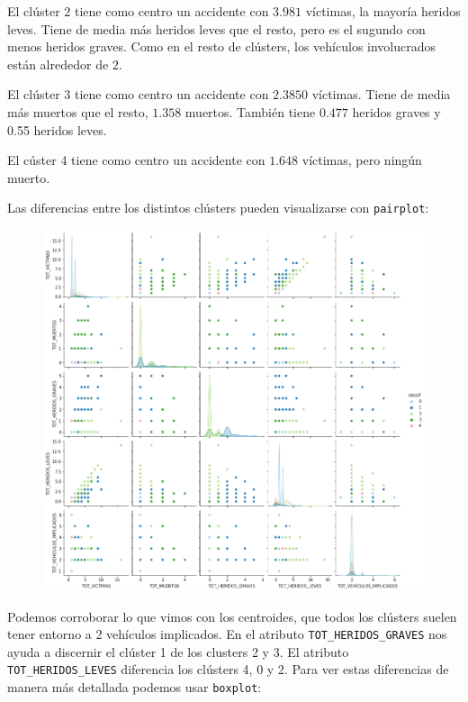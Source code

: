 \documentclass[a4]{article}
\begin{document}
El clúster $2$ tiene como centro un accidente con $3.981$ víctimas, la mayoría heridos leves. Tiene de media más heridos leves que el resto, pero es el sugundo con menos heridos graves. Como en el resto de clústers, los vehículos involucrados están alrededor de $2$.

El clúster $3$ tiene como centro un accidente con $2.3850$ víctimas. Tiene de media más muertos que el resto, $1.358$ muertos. También tiene $0.477$ heridos graves y 0.55 heridos leves.

El cúster 4 tiene como centro un accidente con $1.648$ víctimas, pero ningún muerto.

Las diferencias entre los distintos clústers pueden visualizarse con \texttt{pairplot}:

\begin{figure}[H]
  \centering
  \includegraphics[width=171mm]{imagenes/c1_kmeans_pairplot}
\end{figure}

Podemos corroborar lo que vimos con los centroides, que todos los clústers suelen tener entorno a 2 vehículos implicados. En el atributo \texttt{TOT\_HERIDOS\_GRAVES} nos ayuda a discernir el clúster 1 de los clusters 2 y 3. El atributo \texttt{TOT\_HERIDOS\_LEVES} diferencia los clústers 4, 0 y 2. Para ver estas diferencias de manera más detallada podemos usar \texttt{boxplot}:
\end{document}
